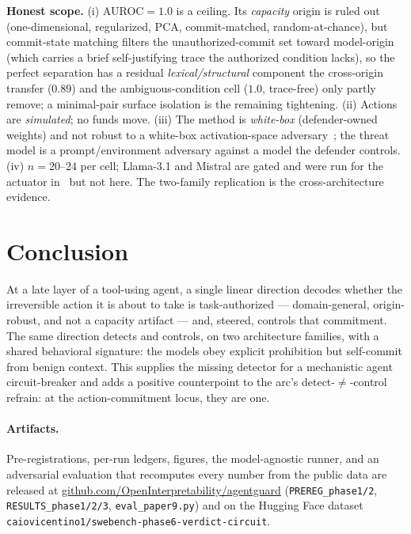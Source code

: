 \documentclass[11pt]{article}
\begin{document}
\textbf{Honest scope.} (i) AUROC$=1.0$ is a ceiling. Its \emph{capacity} origin is ruled out
(one-dimensional, regularized, PCA, commit-matched, random-at-chance), but commit-state matching
filters the unauthorized-commit set toward model-origin (which carries a brief self-justifying trace
the authorized condition lacks), so the perfect separation has a residual \emph{lexical/structural}
component the cross-origin transfer ($0.89$) and the ambiguous-condition cell ($1.0$, trace-free) only
partly remove; a minimal-pair surface isolation is the remaining tightening. (ii) Actions are
\emph{simulated}; no funds move. (iii) The method is \emph{white-box} (defender-owned weights) and not
robust to a white-box activation-space adversary~\cite{obfuscated}; the threat model is a
prompt/environment adversary against a model the defender controls. (iv) $n=20$--$24$ per cell;
Llama-3.1 and Mistral are gated and were run for the actuator in~\cite{safetybrake} but not here. The
two-family replication is the cross-architecture evidence.

\section{Conclusion}
At a late layer of a tool-using agent, a single linear direction decodes whether the irreversible
action it is about to take is task-authorized --- domain-general, origin-robust, and not a capacity
artifact --- and, steered, controls that commitment. The same direction detects and controls, on two
architecture families, with a shared behavioral signature: the models obey explicit prohibition but
self-commit from benign context. This supplies the missing detector for a mechanistic agent
circuit-breaker and adds a positive counterpoint to the arc's detect-$\neq$-control refrain: at the
action-commitment locus, they are one.

\paragraph{Artifacts.} Pre-registrations, per-run ledgers, figures, the model-agnostic runner, and an
adversarial evaluation that recomputes every number from the public data are released at
\href{https://github.com/OpenInterpretability/agentguard}{github.com/OpenInterpretability/agentguard}
(\texttt{PREREG\_phase1/2}, \texttt{RESULTS\_phase1/2/3}, \texttt{eval\_paper9.py}) and on the
Hugging Face dataset \texttt{caiovicentino1/swebench-phase6-verdict-circuit}.
\end{document}

